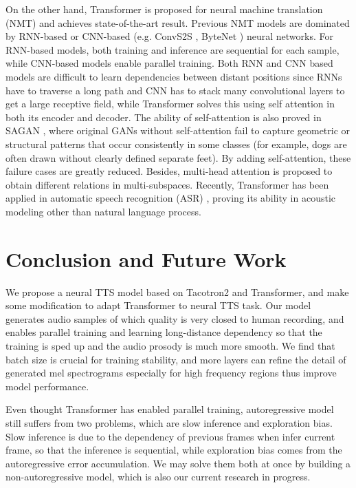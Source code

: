 \documentclass[letterpaper]{article} \usepackage{aaai19}  \usepackage{times}  \usepackage{helvet}  \usepackage{courier}  \usepackage{url}  \usepackage{graphicx}  \frenchspacing
\begin{document}
On the other hand, Transformer \cite{vaswani2017attention} is proposed for neural machine translation (NMT) and achieves state-of-the-art result. Previous NMT models are dominated by RNN-based \cite{bahdanau2014neural} or CNN-based (e.g. ConvS2S \cite{gehring2017convolutional}, ByteNet \cite{kalchbrenner2016neural}) neural networks. For RNN-based models, both training and inference are sequential for each sample, while CNN-based models enable parallel training. Both RNN and CNN based models are difficult to learn dependencies between distant positions since RNNs have to traverse a long path and CNN has to stack many convolutional layers to get a large receptive field, while Transformer solves this using self attention in both its encoder and decoder. The ability of self-attention is also proved in SAGAN \cite{zhang2018self}, where original GANs without self-attention fail to capture geometric or structural patterns that occur consistently in some classes (for example, dogs are often drawn without clearly defined separate feet). By adding self-attention, these failure cases are greatly reduced.
Besides, multi-head attention is proposed to obtain different relations in multi-subspaces. Recently, Transformer has been applied in automatic speech recognition (ASR) \cite{zhou2018comparison,zhou2018syllable}, proving its ability in acoustic modeling other than natural language process.

\section{Conclusion and Future Work}

We propose a neural TTS model based on Tacotron2 and Transformer, and make some modification to adapt Transformer to neural TTS task. Our model generates audio samples of which quality is very closed to human recording, and enables parallel training and learning long-distance dependency so that the training is sped up and the audio prosody is much more smooth. We find that batch size is crucial for training stability, and more layers can refine the detail of generated mel spectrograms especially for high frequency regions thus improve model performance.

Even thought Transformer has enabled parallel training, autoregressive model still suffers from two problems, which are slow inference and exploration bias. Slow inference is due to the dependency of previous frames when infer current frame, so that the inference is sequential, while exploration bias comes from the autoregressive error accumulation. We may solve them both at once by building a non-autoregressive model, which is also our current research in progress.



\end{document}
